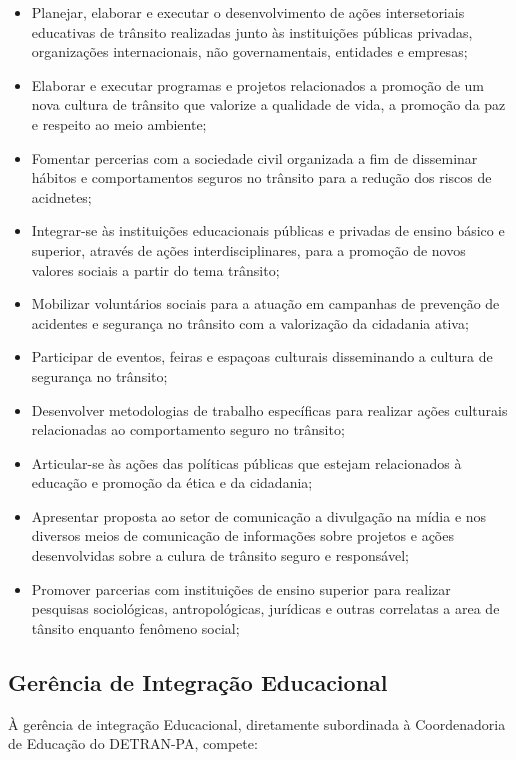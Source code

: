 \documentclass[a4paper]{article}
\begin{document}
\begin{itemize}
\item Planejar, elaborar e executar o desenvolvimento de ações intersetoriais educativas de trânsito realizadas junto às instituições públicas privadas, organizações internacionais, não governamentais, entidades e empresas;
\item Elaborar e executar programas e projetos relacionados a promoção de um nova cultura de trânsito que valorize a qualidade de vida, a promoção da paz e respeito ao  meio ambiente;
\item Fomentar percerias com a sociedade civil organizada a fim de disseminar hábitos e comportamentos seguros no trânsito para a redução dos riscos de acidnetes;
\item Integrar-se às instituições educacionais públicas e privadas de ensino básico e superior, através de ações interdisciplinares, para a promoção de novos valores sociais a partir do tema trânsito;
\item Mobilizar voluntários sociais para a atuação em campanhas de prevenção de acidentes e segurança no trânsito com a valorização da cidadania ativa;
\item Participar de eventos, feiras e espaçoas culturais disseminando a cultura  de segurança no trânsito;
\item Desenvolver metodologias de trabalho específicas para realizar ações culturais relacionadas ao comportamento seguro no trânsito;
\item Articular-se às ações das políticas públicas que estejam relacionados à educação  e promoção da ética e da cidadania;
\item Apresentar proposta ao setor de comunicação a divulgação na mídia e nos diversos meios de comunicação de informações sobre projetos e ações desenvolvidas sobre a culura de trânsito seguro e responsável;
\item Promover parcerias com instituições de ensino superior para realizar pesquisas sociológicas, antropológicas, jurídicas e outras correlatas a area de tânsito enquanto fenômeno social;
\end{itemize}




\subsection{Gerência de Integração Educacional}
À gerência de integração Educacional, diretamente subordinada à Coordenadoria de Educação do DETRAN-PA, compete:
\vskip0.3cm 
\end{document}
